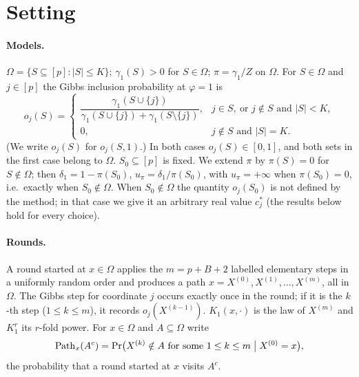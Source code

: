 \documentclass[11pt]{report}
\begin{document}
\section{Setting}

\paragraph{Models.} $\Omega=\{S\subseteq[p]:|S|\le K\}$; $\gamma_1(S)>0$ for $S\in\Omega$; $\pi=\gamma_1/Z$ on $\Omega$.
For $S\in\Omega$ and $j\in[p]$ the Gibbs inclusion probability at $\varphi=1$ is
\[
o_j(S)=\begin{cases}
\dfrac{\gamma_1(S\cup\{j\})}{\gamma_1(S\cup\{j\})+\gamma_1(S\setminus\{j\})}, & j\in S,\ \text{or } j\notin S \text{ and } |S|<K,\\[8pt]
0, & j\notin S \text{ and } |S|=K .
\end{cases}
\]
(We write $o_j(S)$ for $o_j(S,1)$.) In both cases $o_j(S)\in[0,1]$, and both sets in the first case belong to $\Omega$.
$S_0\subseteq[p]$ is fixed. We extend $\pi$ by $\pi(S)=0$ for $S\notin\Omega$; then $\delta_1=1-\pi(S_0)$, $u_\pi=\delta_1/\pi(S_0)$, with $u_\pi=+\infty$ when $\pi(S_0)=0$, i.e.\ exactly when $S_0\notin\Omega$. When $S_0\notin\Omega$ the quantity $o_j(S_0)$ is not defined by the method; in that case we give it an arbitrary real value $c_j^\ast$ (the results below hold for every choice).

\paragraph{Rounds.} A round started at $x\in\Omega$ applies the $m=p+B+2$ labelled elementary steps in a uniformly random order and produces a path $x=X^{(0)},X^{(1)},\dots,X^{(m)}$, all in $\Omega$. The Gibbs step for coordinate $j$ occurs exactly once in the round; if it is the $k$-th step ($1\le k\le m$), it records $o_j(X^{(k-1)})$. $K_1(x,\cdot)$ is the law of $X^{(m)}$ and $K_1^{r}$ its $r$-fold power. For $x\in\Omega$ and $A\subseteq\Omega$ write
\[
\mathrm{Path}_x(A^c)=\Pr\bigl(X^{(k)}\notin A\text{ for some }1\le k\le m \bigm| X^{(0)}=x\bigr),
\]
the probability that a round started at $x$ visits $A^c$.
\end{document}
